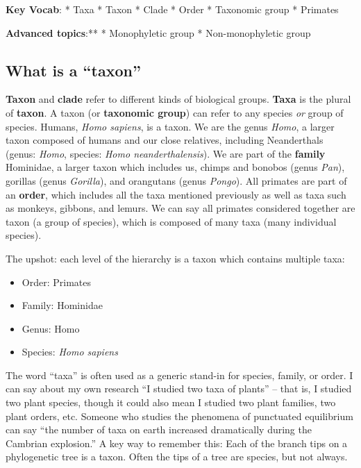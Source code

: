 \documentclass[
]{book}
\providecommand{\tightlist}{%
  \setlength{\itemsep}{0pt}\setlength{\parskip}{0pt}}
\begin{document}
\textbf{Key Vocab}:
* Taxa
* Taxon
* Clade
* Order
* Taxonomic group
* Primates

\textbf{Advanced topics}:**
* Monophyletic group
* Non-monophyletic group

\hypertarget{what-is-a-taxon}{%
\subsection{What is a ``taxon''}\label{what-is-a-taxon}}

\textbf{Taxon} and \textbf{clade} refer to different kinds of biological groups. \textbf{Taxa} is the plural of \textbf{taxon}. A taxon (or \textbf{taxonomic group}) can refer to any species \emph{or} group of species. Humans, \emph{Homo sapiens}, is a taxon. We are the genus \emph{Homo}, a larger taxon composed of humans and our close relatives, including Neanderthals (genus: \emph{Homo}, species: \emph{Homo neanderthalensis}). We are part of the \textbf{family} Hominidae, a larger taxon which includes us, chimps and bonobos (genus \emph{Pan}), gorillas (genus \emph{Gorilla}), and orangutans (genus \emph{Pongo}). All primates are part of an \textbf{order}, which includes all the taxa mentioned previously as well as taxa such as monkeys, gibbons, and lemurs. We can say all primates considered together are taxon (a group of species), which is composed of many taxa (many individual species).

The upshot: each level of the hierarchy is a taxon which contains multiple taxa:

\begin{itemize}
\tightlist
\item
  Order: Primates
\item
  Family: Hominidae
\item
  Genus: Homo
\item
  Species: \emph{Homo sapiens}
\end{itemize}

The word ``taxa'' is often used as a generic stand-in for species, family, or order. I can say about my own research ``I studied two taxa of plants'' -- that is, I studied two plant species, though it could also mean I studied two plant families, two plant orders, etc. Someone who studies the phenomena of punctuated equilibrium can say ``the number of taxa on earth increased dramatically during the Cambrian explosion.'' A key way to remember this: Each of the branch tips on a phylogenetic tree is a taxon. Often the tips of a tree are species, but not always.
\end{document}
